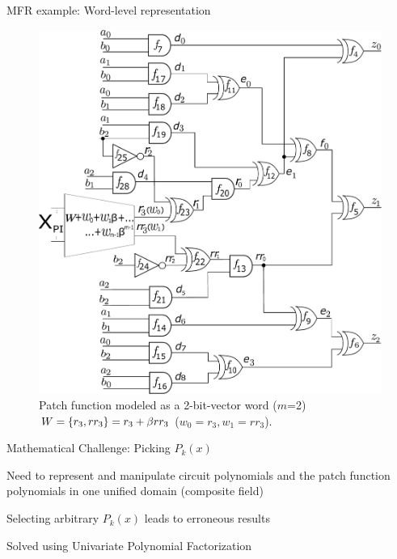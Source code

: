 \begin{frame}{\large MFR example: Word-level representation}
\begin{figure}[hbt]
\centering
    \includegraphics[scale = 0.24]{mas_3_ddc_mfr_b.pdf}
    \caption*{
    Patch function modeled as a 2-bit-vector word ($m$=2) $W=\{r_3,rr_3\} = r_3+\beta rr_3$ ($w_0=r_3, w_1=rr_3$).}
    \label{fig:mas_bug_Wb}
\end{figure}
\end{frame}

\begin{frame}{\large Mathematical Challenge: Picking $P_k(x)$}
\bi 

	\item Need to represent and manipulate circuit polynomials and the patch function polynomials
		in one unified domain (composite field)
	\vspace{0.1in}
	\item Selecting arbitrary $P_k(x)$ leads to erroneous results 
	\vspace{0.1in}
	\item Solved using Univariate Polynomial Factorization

\ei
\end{frame}



